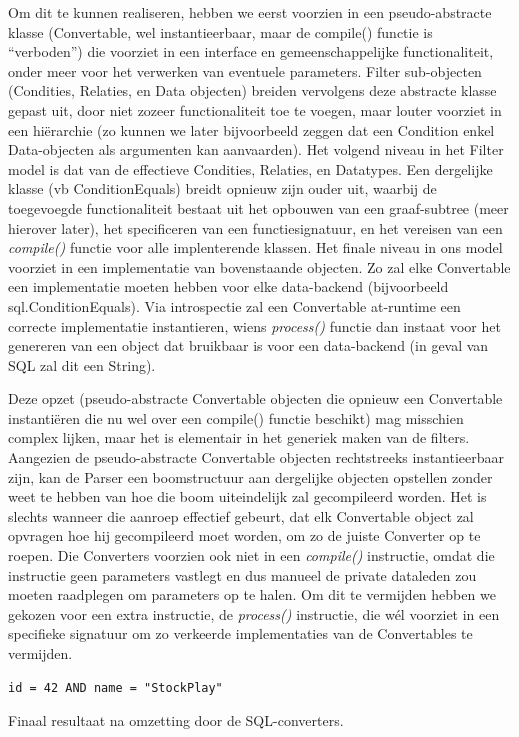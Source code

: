 Om dit te kunnen realiseren, hebben we eerst voorzien in een pseudo-abstracte klasse (Convertable, wel instantieerbaar, maar de compile() functie is ``verboden'') die voorziet in een interface en gemeenschappelijke functionaliteit, onder meer voor het verwerken van eventuele parameters. Filter sub-objecten (Condities, Relaties, en Data objecten) breiden vervolgens deze abstracte klasse gepast uit, door niet zozeer functionaliteit toe te voegen, maar louter voorziet in een hi\"erarchie (zo kunnen we later bijvoorbeeld zeggen dat een Condition enkel Data-objecten als argumenten kan aanvaarden).
Het volgend niveau in het Filter model is dat van de effectieve Condities, Relaties, en Datatypes. Een dergelijke klasse (vb ConditionEquals) breidt opnieuw zijn ouder uit, waarbij de toegevoegde functionaliteit bestaat uit het opbouwen van een graaf-subtree (meer hierover later), het specificeren van een functiesignatuur, en het vereisen van een \emph{compile()} functie voor alle implenterende klassen.
Het finale niveau in ons model voorziet in een implementatie van bovenstaande objecten. Zo zal elke Convertable een implementatie moeten hebben voor elke data-backend (bijvoorbeeld sql.ConditionEquals). Via introspectie zal een Convertable at-runtime een correcte implementatie instantieren, wiens \emph{process()} functie dan instaat voor het genereren van een object dat bruikbaar is voor een data-backend (in geval van SQL zal dit een String).

Deze opzet (pseudo-abstracte Convertable objecten die opnieuw een Convertable instanti\"eren die nu wel over een compile() functie beschikt) mag misschien complex lijken, maar het is elementair in het generiek maken van de filters. Aangezien de pseudo-abstracte Convertable objecten rechtstreeks instantieerbaar zijn, kan de Parser een boomstructuur aan dergelijke objecten opstellen zonder weet te hebben van hoe die boom uiteindelijk zal gecompileerd worden. Het is slechts wanneer die aanroep effectief gebeurt, dat elk Convertable object zal opvragen hoe hij gecompileerd moet worden, om zo de juiste Converter op te roepen. Die Converters voorzien ook niet in een \emph{compile()} instructie, omdat die instructie geen parameters vastlegt en dus manueel de private dataleden zou moeten raadplegen om parameters op te halen. Om dit te vermijden hebben we gekozen voor een extra instructie, de \emph{process()} instructie, die w\'el voorziet in een specifieke signatuur om zo verkeerde implementaties van de Convertables te vermijden.

\begin{code}
\begin{verbatim}
id = 42 AND name = "StockPlay"
\end{verbatim}
\caption{Finaal resultaat na omzetting door de SQL-converters.}
\end{code}


